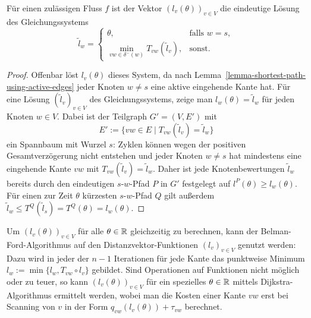 \begin{proposition}\label{prop-arrival-times-vector}
	Für einen zulässigen Fluss $f$ ist der Vektor $(l_v(\theta))_{v\in V}$ die eindeutige Lösung des Gleichungssystems
	\[ \tilde{l}_w = \begin{cases}
	\theta, & \text{falls } w=s, \\
	\min\limits_{vw\in \delta^-(w)} T_{vw}(\tilde{l}_v), & \text{sonst}.
	\end{cases} \]
\end{proposition}
\begin{proof}
	Offenbar löst $l_v(\theta)$ dieses System, da nach Lemma~\ref{lemma-shortest-path-using-active-edges} jeder Knoten $w\neq s$ eine aktive eingehende Kante hat.
	Für eine Lösung $(\tilde{l}_v)_{v\in V}$ des Gleichungssystems, zeige man $l_w(\theta) = \tilde{l}_w$ für jeden Knoten $w\in V$.
	Dabei ist der Teilgraph $G'=(V, E')$ mit
	\[ E' := \{ vw \in E \mid T_{vw}(\tilde{l}_v ) = \tilde{l}_w \} \]
	ein Spannbaum mit Wurzel $s$:
	Zyklen können wegen der positiven Gesamtverzögerung nicht entstehen und jeder Knoten $w\neq s$ hat mindestens eine eingehende Kante $vw$ mit $T_{vw}(\tilde{l}_v) = \tilde{l}_w$.
	Daher ist jede Knotenbewertungen $\tilde{l}_w$ bereits durch den eindeutigen $s$-$w$-Pfad $P$ in $G'$ festgelegt auf $l^P(\theta)\geq l_w(\theta)$.
	Für einen zur Zeit $\theta$ kürzesten $s$-$w$-Pfad $Q$ gilt außerdem $\tilde{l}_w \leq T^Q(\tilde{l}_s) = T^Q(\theta) = l_w(\theta)$.
\end{proof}

Um $(l_v(\theta))_{v\in V}$ für alle $\theta\in\mathbb{R}$ gleichzeitig zu berechnen, kann der Belman-Ford-Algorithmus auf den Distanzvektor-Funktionen $(l_v)_{v\in V}$ genutzt werden:
Dazu wird in jeder der $n-1$ Iterationen für jede Kante das punktweise Minimum $l_w := \min\{ l_w, T_{vw}\circ l_v \}$ gebildet.
Sind Operationen auf Funktionen nicht möglich oder zu teuer, so kann $(l_v(\theta))_{v\in V}$ für ein spezielles $\theta\in\mathbb{R}$ mittels Dijkstra-Algorithmus ermittelt werden, wobei man die Kosten einer Kante $vw$ erst bei Scanning von $v$ in der Form $q_{vw}(l_v(\theta)) + \tau_{vw}$ berechnet.